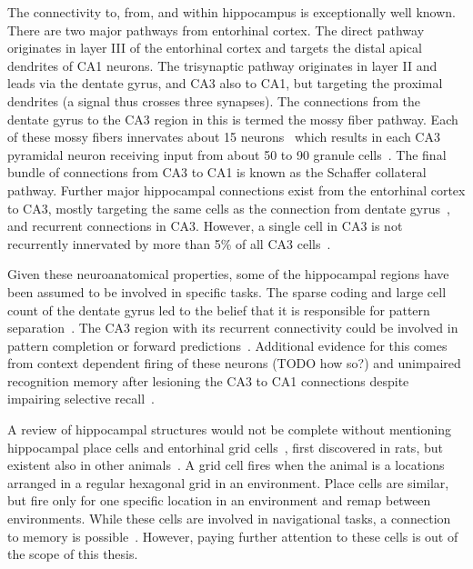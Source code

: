 The connectivity to, from, and within hippocampus is exceptionally well known.
There are two major pathways from entorhinal cortex.
The direct pathway originates in layer III of the entorhinal cortex and targets the distal apical dendrites of CA1 neurons.
The trisynaptic pathway originates in layer II and leads via the dentate gyrus, and CA3 also to CA1, but targeting the proximal dendrites (a signal thus crosses three synapses).
The connections from the dentate gyrus to the CA3 region in this is termed the mossy fiber pathway.
Each of these mossy fibers innervates about 15 neurons~\parencite{Claiborne1986} which results in each CA3 pyramidal neuron receiving input from about 50 to 90 granule cells~\parencite[230]{Squire1989}.
The final bundle of connections from CA3 to CA1 is known as the Schaffer collateral pathway.
Further major hippocampal connections exist from the entorhinal cortex to CA3, mostly targeting the same cells as the connection from dentate gyrus~\parencite{Paxinos2014}, and recurrent connections in CA3.
However, a single cell in CA3 is not recurrently innervated by more than 5\% of all CA3 cells~\parencite[231]{Squire1989}.

Given these neuroanatomical properties, some of the hippocampal regions have been assumed to be involved in specific tasks.
The sparse coding and large cell count of the dentate gyrus led to the belief that it is responsible for pattern separation~\parencite{Rolls2013}.
The CA3 region with its recurrent connectivity could be involved in pattern completion or forward predictions~\parencite{Leutgeb2007,Rolls2013}.
Additional evidence for this comes from context dependent firing of these neurons (TODO how so?) \parencite{Guzowski2004,Leutgeb2007} and unimpaired recognition memory after lesioning the CA3 to CA1 connections despite impairing selective recall~\parencite{Brun2002}. 

A review of hippocampal structures would not be complete without mentioning hippocampal place cells and entorhinal grid cells~\parencite{hafting2005}, first discovered in rats, but existent also in other animals~\parencite{buzsaki2013}.
A grid cell fires when the animal is a locations arranged in a regular hexagonal grid in an environment.
Place cells are similar, but fire only for one specific location in an environment and remap between environments.
While these cells are involved in navigational tasks, a connection to memory is possible~\parencite{buzsaki2013}.
However, paying further attention to these cells is out of the scope of this thesis.

